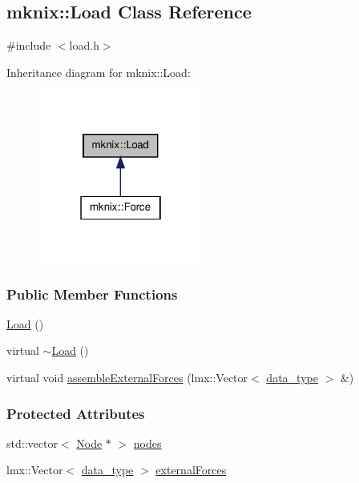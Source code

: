 \hypertarget{classmknix_1_1_load}{\subsection{mknix\-:\-:Load Class Reference}
\label{classmknix_1_1_load}
}


{\ttfamily \#include $<$load.\-h$>$}



Inheritance diagram for mknix\-:\-:Load\-:\nopagebreak
\begin{figure}[H]
\begin{center}
\leavevmode
\includegraphics[width=154pt]{d2/dcd/classmknix_1_1_load__inherit__graph}
\end{center}
\end{figure}
\subsubsection*{Public Member Functions}
\begin{DoxyCompactItemize}
\item 
\hyperlink{classmknix_1_1_load_a12f3697ad50880cb92bfc7267cca6a1c}{Load} ()
\item 
virtual \hyperlink{classmknix_1_1_load_a79f63ce975fa0c0ad2d9cd8269908b8f}{$\sim$\-Load} ()
\item 
virtual void \hyperlink{classmknix_1_1_load_a93aeafe41cb8ea7c97ae20b5870c5c9e}{assemble\-External\-Forces} (lmx\-::\-Vector$<$ \hyperlink{namespacemknix_a16be4b246fbf2cceb141e3a179111020}{data\-\_\-type} $>$ \&)
\end{DoxyCompactItemize}
\subsubsection*{Protected Attributes}
\begin{DoxyCompactItemize}
\item 
std\-::vector$<$ \hyperlink{classmknix_1_1_node}{Node} $\ast$ $>$ \hyperlink{classmknix_1_1_load_a0cff22a8b9f289b38d978546160b6bb6}{nodes}
\item 
lmx\-::\-Vector$<$ \hyperlink{namespacemknix_a16be4b246fbf2cceb141e3a179111020}{data\-\_\-type} $>$ \hyperlink{classmknix_1_1_load_afbf0c36d2962e6bd85812ef7d498d314}{external\-Forces}
\end{DoxyCompactItemize}


